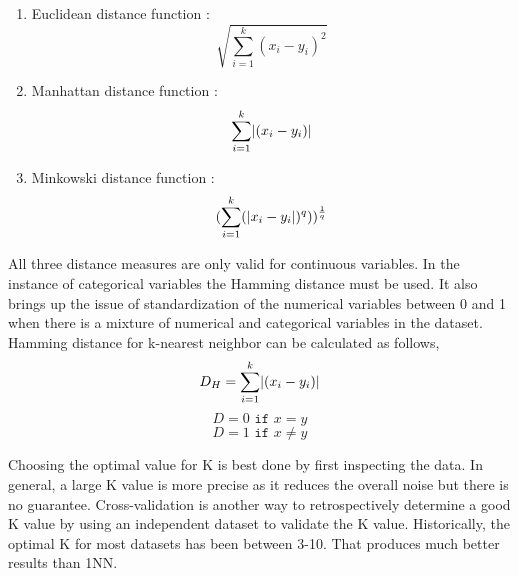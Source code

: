 \documentclass[12pt,a4paper]{report}
\DeclarePairedDelimiter{\abs}{\lvert}{\rvert}
\begin{document}
\begin{enumerate}
    \item Euclidean distance function :
    \begin{equation}
        \sqrt{\sum_{i=1}^{k}(x_i-y_i)^2}
    \end{equation}
    \item Manhattan distance function :
    \begin{equation}
         \sum_{i=1}^{k}\abs{(x_i-y_i)}
    \end{equation}
    \item Minkowski distance function :
    \begin{equation}
        ({\sum_{i=1}^{k}(\abs{x_i-y_i})^q)})^\frac{1}{q}
    \end{equation}
    
\end{enumerate}
\par\noindent
All three distance measures are only valid for continuous variables. In the instance of categorical variables the Hamming distance must be used. It also brings up the issue of standardization of the numerical variables between 0 and 1 when there is a mixture of numerical and categorical variables in the dataset. Hamming distance for k-nearest neighbor can be calculated as follows,
\begin{equation}
    D_H = \sum_{i=1}^{k}\abs{(x_i-y_i)}
\end{equation}
$$ D = 0 \texttt{ if } x = y $$
$$ D = 1 \texttt{ if } x\neq y $$
\par\noindent
Choosing the optimal value for K is best done by first inspecting the data. In general, a large K value is more precise as it reduces the overall noise but there is no guarantee.  Cross-validation is another way to retrospectively determine a good K value by using an independent dataset to validate the K value. Historically, the optimal K for most datasets has been between 3-10. That produces much better results than 1NN.
\clearpage
\end{document}
